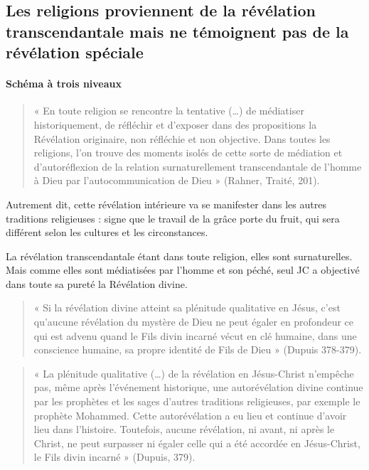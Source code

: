 \subsection{Les religions proviennent de la révélation transcendantale mais ne témoignent pas de la révélation spéciale }
 
 
 \paragraph{Schéma à trois niveaux}
 \begin{quote}
     « En toute religion se rencontre la tentative (…) de médiatiser historiquement, de réfléchir et d’exposer dans des propositions la Révélation originaire, non réfléchie et non objective. Dans toutes les religions, l’on trouve des moments isolés de cette sorte de médiation et d’autoréflexion de la relation surnaturellement transcendantale de l’homme à Dieu par l’autocommunication de Dieu » (Rahner, Traité, 201). 
 \end{quote}

Autrement dit, cette révélation intérieure va se manifester dans les autres traditions religieuses : signe que le travail de la grâce porte du fruit, qui sera différent selon les cultures et les circonstances.

La révélation transcendantale étant dans toute religion, elles sont surnaturelles. Mais comme elles sont médiatisées par l'homme et son péché, seul JC a objectivé dans toute sa pureté la Révélation divine.
\begin{quote}
 « Si la révélation divine atteint sa plénitude qualitative en Jésus, c’est qu’aucune révélation du mystère de Dieu ne peut égaler en profondeur ce qui est advenu quand le Fils divin incarné vécut en clé humaine, dans une conscience humaine, sa propre identité de Fils de Dieu » (Dupuis 378-379).   
\end{quote}



\begin{quote}
    « La plénitude qualitative (…) de la révélation en Jésus-Christ n’empêche pas, même après l’événement historique, une autorévélation divine continue par les prophètes et les sages d’autres traditions religieuses, par exemple le prophète Mohammed. Cette autorévélation a eu lieu et continue d’avoir lieu dans l’histoire. Toutefois, aucune révélation, ni avant, ni après le Christ, ne peut surpasser ni égaler celle qui a été accordée en Jésus-Christ, le Fils divin incarné » (Dupuis, 379).
\end{quote}
 



